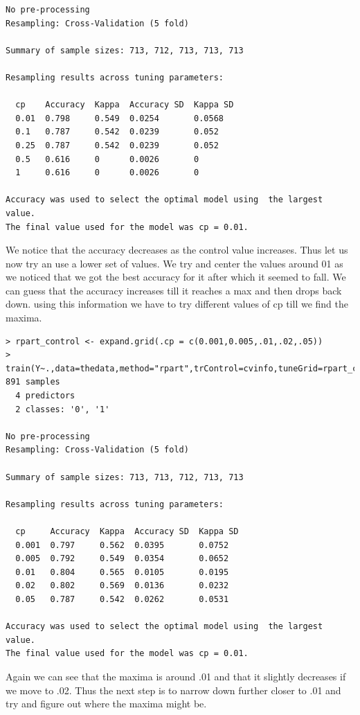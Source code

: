\documentclass[fontsize=10pt]{scrartcl}
\begin{document}
\begin{enumerate}
\begin{verbatim}
No pre-processing
Resampling: Cross-Validation (5 fold) 

Summary of sample sizes: 713, 712, 713, 713, 713 

Resampling results across tuning parameters:

  cp    Accuracy  Kappa  Accuracy SD  Kappa SD
  0.01  0.798     0.549  0.0254       0.0568  
  0.1   0.787     0.542  0.0239       0.052   
  0.25  0.787     0.542  0.0239       0.052   
  0.5   0.616     0      0.0026       0       
  1     0.616     0      0.0026       0       

Accuracy was used to select the optimal model using  the largest value.
The final value used for the model was cp = 0.01. 
\end{verbatim}
			
			We notice that the accuracy decreases as the control value increases. Thus let us now try an use a lower set of values. We try and center the values around 01 as we noticed that we got the best accuracy for it after which it seemed to fall. We can guess that the accuracy increases till it reaches a max and then drops back down. using this information we have to try different values of cp till we find the maxima.

\begin{verbatim}
> rpart_control <- expand.grid(.cp = c(0.001,0.005,.01,.02,.05)) 
> train(Y~.,data=thedata,method="rpart",trControl=cvinfo,tuneGrid=rpart_control)
891 samples
  4 predictors
  2 classes: '0', '1' 

No pre-processing
Resampling: Cross-Validation (5 fold) 

Summary of sample sizes: 713, 713, 712, 713, 713 

Resampling results across tuning parameters:

  cp     Accuracy  Kappa  Accuracy SD  Kappa SD
  0.001  0.797     0.562  0.0395       0.0752  
  0.005  0.792     0.549  0.0354       0.0652  
  0.01   0.804     0.565  0.0105       0.0195  
  0.02   0.802     0.569  0.0136       0.0232  
  0.05   0.787     0.542  0.0262       0.0531  

Accuracy was used to select the optimal model using  the largest value.
The final value used for the model was cp = 0.01. 
\end{verbatim}

			Again we can see that the maxima is around .01 and that it slightly decreases if we move to .02. Thus the next step is to narrow down further closer to .01 and try and figure out where the maxima might be.


\end{enumerate}
\end{document}
